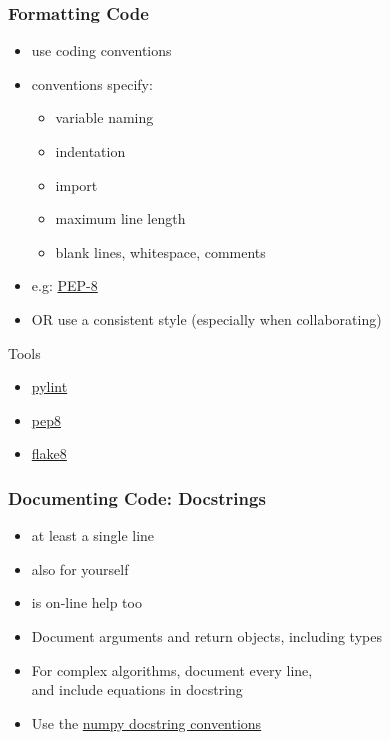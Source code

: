 \documentclass{beamer}
\begin{document}
\begin{frame}
 \frametitle{Formatting Code}

\begin{itemize}
  \item use coding conventions
  \item conventions specify:
\begin{itemize}
  \item variable naming
  \item indentation
  \item import
  \item maximum line length
  \item blank lines, whitespace, comments
\end{itemize}
  \item e.g: \href{http://www.python.org/dev/peps/pep-0008/}{PEP-8}
  \item OR use a consistent style (especially when collaborating)
\end{itemize}

\begin{block}{Tools}
\begin{itemize}
  \item \href{http://www.pylint.org/}{pylint}
  \item \href{https://pypi.python.org/pypi/pep8}{pep8}
  \item \href{http://pypi.python.org/pypi/flake8/}{flake8} %
\end{itemize}
\end{block}

\end{frame}


\begin{frame}
 \frametitle{Documenting Code: Docstrings}

\begin{example}
\end{example}

\begin{itemize}
  \item at least a single line 
  \item also for yourself
  \item is on-line help too
\end{itemize}

\begin{itemize}
  \item Document arguments and return objects, including types
  \item For complex algorithms, document every line,\\ and include equations in docstring
  \item Use the \href{https://github.com/numpy/numpy/blob/master/doc/HOWTO_DOCUMENT.rst.txt}{numpy docstring conventions}
\end{itemize}
\end{frame}
\end{document}

